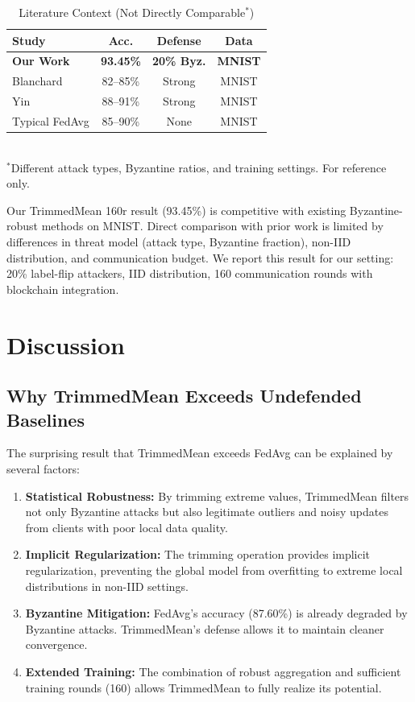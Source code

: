 \documentclass[12pt,a4paper,onecolumn]{article}
\begin{document}
\begin{table}[t]
\caption{Literature Context (Not Directly Comparable$^*$)}
\label{tab:literature_comparison}
\centering
{\scriptsize
\begin{tabular}{lccc}
\toprule
\textbf{Study} & \textbf{Acc.} & \textbf{Defense} & \textbf{Data} \\
\midrule
\textbf{Our Work} & \textbf{93.45\%} & \textbf{20\% Byz.} & \textbf{MNIST} \\
Blanchard~\cite{blanchard2017machine} & 82--85\% & Strong & MNIST \\
Yin~\cite{yin2018byzantine} & 88--91\% & Strong & MNIST \\
Typical FedAvg & 85--90\% & None & MNIST \\
\bottomrule
\end{tabular}
}
\\[0.05cm]
{\tiny $^*$Different attack types, Byzantine ratios, and training settings. For reference only.}
\end{table}

Our TrimmedMean 160r result (93.45\%) is competitive with existing Byzantine-robust methods on MNIST. Direct comparison with prior work is limited by differences in threat model (attack type, Byzantine fraction), non-IID distribution, and communication budget. We report this result for our setting: 20\% label-flip attackers, IID distribution, 160 communication rounds with blockchain integration.

\section{Discussion}
\label{sec:discussion}

\subsection{Why TrimmedMean Exceeds Undefended Baselines}

The surprising result that TrimmedMean exceeds FedAvg can be explained by several factors:

\begin{enumerate}
    \item \textbf{Statistical Robustness:} By trimming extreme values, TrimmedMean filters not only Byzantine attacks but also legitimate outliers and noisy updates from clients with poor local data quality.
    
    \item \textbf{Implicit Regularization:} The trimming operation provides implicit regularization, preventing the global model from overfitting to extreme local distributions in non-IID settings.
    
    \item \textbf{Byzantine Mitigation:} FedAvg's accuracy (87.60\%) is already degraded by Byzantine attacks. TrimmedMean's defense allows it to maintain cleaner convergence.
    
    \item \textbf{Extended Training:} The combination of robust aggregation and sufficient training rounds (160) allows TrimmedMean to fully realize its potential.
\end{enumerate}
\end{document}
